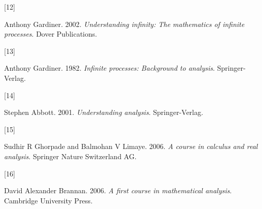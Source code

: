 \documentclass[
  a4paper,
]{article}
\newlength{\cslhangindent}
\newlength{\csllabelwidth}
\newenvironment{CSLReferences}[2] %
 {\begin{list}{}{%
  \setlength{\itemindent}{0pt}
  \setlength{\leftmargin}{0pt}
  \setlength{\parsep}{0pt}
  \ifodd #1
   \setlength{\leftmargin}{\cslhangindent}
   \setlength{\itemindent}{-1\cslhangindent}
  \fi
  \setlength{\itemsep}{#2\baselineskip}}}
 {\end{list}}
\newcommand{\CSLLeftMargin}[1]{\parbox[t]{\csllabelwidth}{\strut#1\strut}}
\newcommand{\CSLRightInline}[1]{\parbox[t]{\linewidth - \csllabelwidth}{\strut#1\strut}}
\begin{document}
\begin{CSLReferences}{0}{0}
\CSLLeftMargin{{[}12{]} }%
\CSLRightInline{Anthony Gardiner. 2002. \emph{Understanding infinity:
The mathematics of infinite processes}. Dover Publications.}

\CSLLeftMargin{{[}13{]} }%
\CSLRightInline{Anthony Gardiner. 1982. \emph{Infinite processes:
Background to analysis}. Springer-Verlag.}

\CSLLeftMargin{{[}14{]} }%
\CSLRightInline{Stephen Abbott. 2001. \emph{Understanding analysis}.
Springer-Verlag.}

\CSLLeftMargin{{[}15{]} }%
\CSLRightInline{Sudhir R Ghorpade and Balmohan V Limaye. 2006. \emph{A
course in calculus and real analysis}. Springer Nature Switzerland AG.}

\CSLLeftMargin{{[}16{]} }%
\CSLRightInline{David Alexander Brannan. 2006. \emph{A first course in
mathematical analysis}. Cambridge University Press.}

\end{CSLReferences}
\end{document}
